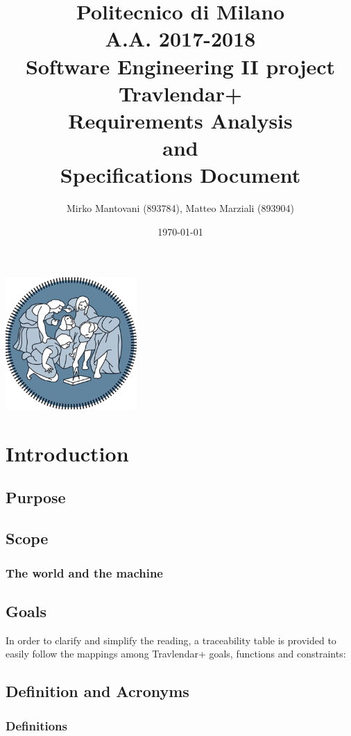 \documentclass{article}
\author{Mirko Mantovani (893784), Matteo Marziali (893904)}
\date{\today}
\title{Politecnico di Milano
	\\A.A. 2017\@-\@2018
	\\Software Engineering II project \\ \textbf{Travlendar+}
	\\\textbf{R}equirements \textbf{A}nalysis \\and\\ \textbf{S}pecifications \textbf{D}ocument}
\begin{document}
\maketitle
\begin{center}
	\includegraphics[width=5cm]{polimi-logo}
\end{center}
\clearpage
{\hypersetup{hidelinks}\tableofcontents}
\clearpage

\section{Introduction}

\subsection{Purpose}



\newpage
\subsection{Scope}

\subsubsection{The world and the machine}

\clearpage
\subsection{Goals}

In order to clarify and simplify the reading, a traceability table is provided to easily follow the mappings among Travlendar+ goals, functions and constraints: \\

\clearpage

\subsection{Definition and Acronyms}

\subsubsection{Definitions}

\end{document}
